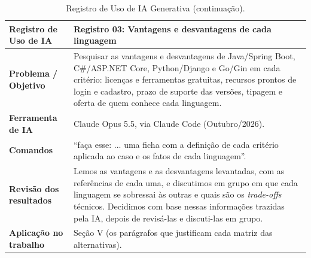 \documentclass[a4paper]{article}
\begin{document}
\begin{table}[H]
    \centering
    \renewcommand{\arraystretch}{1.5}
    \small
    \begin{tabular}{|>{\raggedright\arraybackslash}p{3cm}|p{12.4cm}|}
        \hline
        \rowcolor{eapC}
        \textbf{Registro de Uso de IA} & \textbf{Registro 03: Vantagens e desvantagens de cada linguagem} \\
        \hline
        \textbf{Problema / Objetivo} & Pesquisar as vantagens e desvantagens de Java/Spring Boot, C\#/ASP.NET Core, Python/Django e Go/Gin em cada critério: licenças e ferramentas gratuitas, recursos prontos de login e cadastro, prazo de suporte das versões, tipagem e oferta de quem conhece cada linguagem. \\
        \hline
        \textbf{Ferramenta de IA} & Claude Opus 5.5, via Claude Code (Outubro/2026). \\
        \hline
        \textbf{Comandos} & \enquote{faça esse: ... uma ficha com a definição de cada critério aplicada ao caso e os fatos de cada linguagem}. \\
        \hline
        \textbf{Revisão dos resultados} & Lemos as vantagens e as desvantagens levantadas, com as referências de cada uma, e discutimos em grupo em que cada linguagem se sobressai às outras e quais são os \textit{trade-offs} técnicos. Decidimos com base nessas informações trazidas pela IA, depois de revisá-las e discuti-las em grupo. \\
        \hline
        \textbf{Aplicação no trabalho} & Seção V (os parágrafos que justificam cada matriz das alternativas). \\
        \hline
    \end{tabular}
    \caption{Registro de Uso de IA Generativa (continuação).}
    \label{tab:uso_ia_cont}
\end{table}
\end{document}
